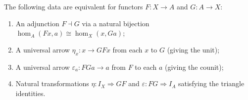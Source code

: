 The following data are equivalent for functors $F: X \to A$ and $G: A \to X$:
\begin{enumerate}
\item An adjunction $F \dashv G$ via a natural bijection $\hom_A(Fx, a) \cong \hom_X(x, Ga)$;
\item A universal arrow $\eta_x: x \to GFx$ from each $x$ to $G$ (giving the unit);
\item A universal arrow $\varepsilon_a: FGa \to a$ from $F$ to each $a$ (giving the counit);
\item Natural transformations $\eta: I_X \Rightarrow GF$ and $\varepsilon: FG \Rightarrow I_A$ satisfying the triangle identities.
\end{enumerate}
